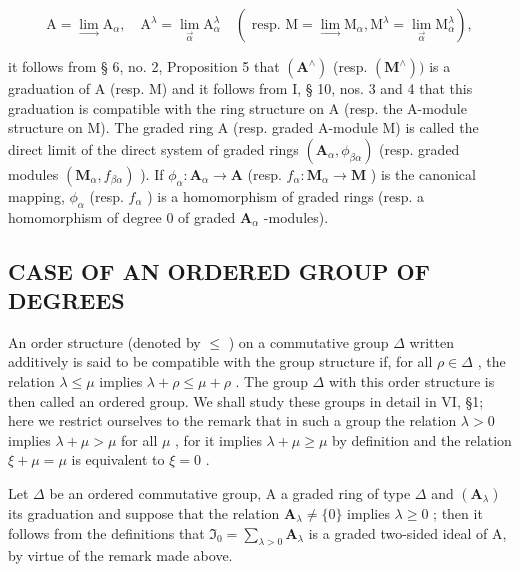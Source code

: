 \[
\mathrm{A} = \lim _ {\rightarrow} \mathrm{A} _ {\alpha}, \quad \mathrm{A} ^ {\lambda} = \lim _ {\overrightarrow {\alpha}} \mathrm{A} _ {\alpha} ^ {\lambda} \quad (\text { resp.   } \mathrm{M} = \lim _ {\rightarrow} \mathrm{M} _ {\alpha}, \mathrm{M} ^ {\lambda} = \lim _ {\overrightarrow {\alpha}} \mathrm{M} _ {\alpha} ^ {\lambda}),
\]

it follows from § 6, no. 2, Proposition 5 that \((\mathbf{A}^{\wedge})\) (resp. \((\mathbf{M}^{\wedge}))\) is a graduation of A (resp. M) and it follows from I, § 10, nos. 3 and 4 that this graduation is compatible with the ring structure on A (resp. the A-module structure on M). The graded ring A (resp. graded A-module M) is called the direct limit of the direct system of graded rings \((\mathbf{A}_{\alpha}, \phi_{\beta \alpha})\) (resp. graded modules \((\mathbf{M}_{\alpha}, f_{\beta \alpha})\) ). If \(\phi_{\alpha} \colon \mathbf{A}_{\alpha} \to \mathbf{A}\) (resp. \(f_{\alpha} \colon \mathbf{M}_{\alpha} \to \mathbf{M}\) ) is the canonical mapping, \(\phi_{\alpha}\) (resp. \(f_{\alpha}\) ) is a homomorphism of graded rings (resp. a homomorphism of degree 0 of graded \(\mathbf{A}_{\alpha}\) -modules).

\subsection{CASE OF AN ORDERED GROUP OF DEGREES}

An order structure (denoted by \(\leqslant\) ) on a commutative group \(\Delta\) written additively is said to be compatible with the group structure if, for all \(\rho\in\Delta\) , the relation \(\lambda\leqslant\mu\) implies \(\lambda+\rho\leqslant\mu+\rho\) . The group \(\Delta\) with this order structure is then called an ordered group. We shall study these groups in detail in VI, §1; here we restrict ourselves to the remark that in such a group the relation \(\lambda>0\) implies \(\lambda+\mu>\mu\) for all \(\mu\) , for it implies \(\lambda+\mu\geqslant\mu\) by definition and the relation \(\xi+\mu=\mu\) is equivalent to \(\xi=0\) .

Let \(\Delta\) be an ordered commutative group, A a graded ring of type \(\Delta\) and \((\mathbf{A}_{\lambda})\) its graduation and suppose that the relation \(\mathbf{A}_{\lambda} \neq \{0\}\) implies \(\lambda \geqslant 0\) ; then it follows from the definitions that \(\mathfrak{I}_0 = \sum_{\lambda > 0} \mathbf{A}_{\lambda}\) is a graded two-sided ideal of A, by virtue of the remark made above.

